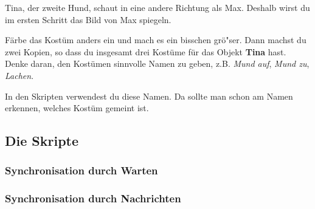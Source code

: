 \documentclass[12pt,a4paper,titlepage]{article}
\begin{document}
Tina, der zweite Hund, schaut in eine andere Richtung als Max. Deshalb wirst du im ersten Schritt das Bild von Max spiegeln.

Färbe das Kostüm anders ein und mach es ein bisschen grö"ser. Dann machst du zwei Kopien, so dass du insgesamt drei Kostüme für das Objekt \textbf{Tina} hast. Denke daran, den Kostümen sinnvolle Namen zu geben, z.B. \textit{Mund auf}, \textit{Mund zu}, \textit{Lachen}.

In den Skripten verwendest du diese Namen. Da sollte man schon am Namen erkennen, welches Kostüm gemeint ist.

\subsection{Die Skripte}

\subsubsection{Synchronisation durch Warten}

\subsubsection{Synchronisation durch Nachrichten}
\end{document}
